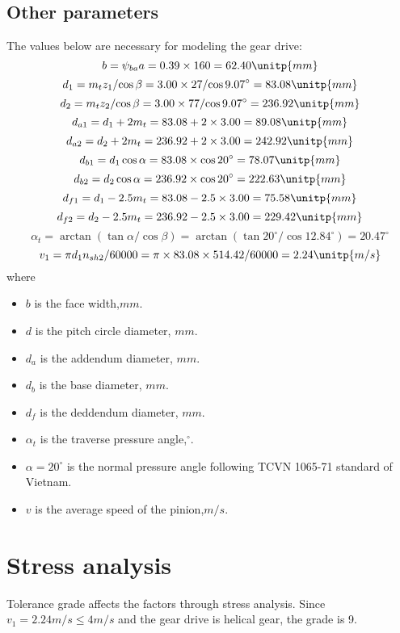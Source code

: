 \subsection{Other parameters}
The values below are necessary for modeling the gear drive:\\
\[ b = \psi_{ba}a = 0.39\times 160= 62.40\unitp{mm}\]
\[ d_1 = {m_tz_1}/{\cos\beta} = {3.00\times 27}/{\cos9.07^\circ} = 83.08\unitp{mm}\]
\[ d_2 = {m_tz_2}/{\cos\beta} = {3.00\times 77}/{\cos9.07^\circ} = 236.92\unitp{mm}\]
\[ d_{a1} = d_1 + 2m_t = 83.08 + 2\times 3.00 = 89.08\unitp{mm}\]
\[ d_{a2} = d_2 + 2m_t = 236.92 + 2\times 3.00 = 242.92\unitp{mm}\]
\[ d_{b1} = d_1\cos\alpha = 83.08\times \cos 20^\circ = 78.07\unitp{mm}\]
\[ d_{b2} = d_2\cos\alpha = 236.92\times \cos 20^\circ = 222.63 \unitp{mm}\]
\[ d_{f1} = d_1 - 2.5m_t = 83.08 - 2.5\times 3.00 = 75.58\unitp{mm}\]
\[ d_{f2} = d_2 - 2.5m_t = 236.92 - 2.5\times 3.00 = 229.42\unitp{mm}\]
\[ \alpha_t = \arctan\left({\tan\alpha}/{\cos\beta}\right) = \arctan\left({\tan 20^\circ}/{\cos 12.84^\circ}\right) = 20.47^\circ\]
\[ v_1 = {\pi d_1n_{sh2}}/{60000} = {\pi \times 83.08 \times 514.42}/{60000} = 2.24\unitp{m/s}\]
where
\begin{itemize}
	\item $ b $ is the face width,$ \unit{mm} $.
	\item $ d $ is the pitch circle diameter, $ \unit{mm} $.
	\item $ d_a $ is the addendum diameter, $ \unit{mm} $.
	\item $ d_b $ is the base diameter, $ \unit{mm} $.
	\item $ d_f $ is the deddendum diameter, $ \unit{mm} $.
	\item $ \alpha_t $ is the traverse pressure angle,$ ^\circ $.
	\item $ \alpha=20^\circ $ is the normal pressure angle following TCVN 1065-71 standard of Vietnam.
	\item $ v $ is the average speed of the pinion,$ \unit{m/s} $.
\end{itemize}

\section{Stress analysis}
Tolerance grade affects the factors through stress analysis. Since $ v_1=2.24 \unit{m/s} \leq 4 \unit{m/s} $ and the gear drive is helical gear, the grade is 9.
